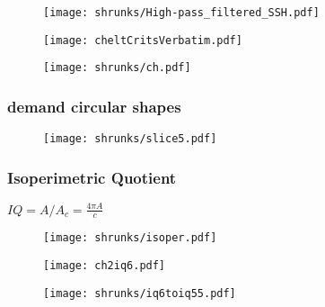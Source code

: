 \begin{frame}
\begin{figure}
	\centering
	\texttt{[image: shrunks/High-pass\_filtered\_SSH.pdf]}
\end{figure}
\end{frame}

\begin{frame}	
\begin{figure}
	\begin{centering}
	\texttt{[image: cheltCritsVerbatim.pdf]}%
	\end{centering}
\texttt{[image: shrunks/ch.pdf]}
\end{figure}
\end{frame}

\begin{frame}
 \frametitle{demand circular shapes}
\begin{figure}
	\centering	
	\texttt{[image: shrunks/slice5.pdf]}
\end{figure}
\end{frame}

\begin{frame}
 \frametitle{Isoperimetric Quotient}
  $IQ= A/A_{c}=\frac{4 \pi A}{c}$
\begin{figure}
	\texttt{[image: shrunks/isoper.pdf]}
\end{figure}
\end{frame}

\begin{frame}
\begin{figure}
	\centering
	\texttt{[image: ch2iq6.pdf]}
\end{figure}
\end{frame}


\begin{frame}
\begin{figure}
	\centering
	\texttt{[image: shrunks/iq6toiq55.pdf]}
\end{figure}
\end{frame}

